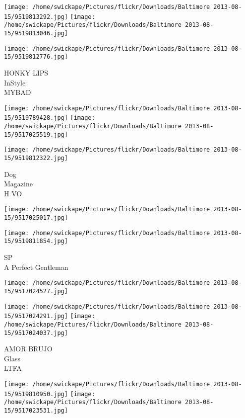 \documentclass[10pt,letterpaper]{article}
\begin{document}
\texttt{[image: /home/swickape/Pictures/flickr/Downloads/Baltimore 2013-08-15/9519813292.jpg]}
\texttt{[image: /home/swickape/Pictures/flickr/Downloads/Baltimore 2013-08-15/9519813046.jpg]}

\vspace{0.25in}
\texttt{[image: /home/swickape/Pictures/flickr/Downloads/Baltimore 2013-08-15/9519812776.jpg]}

HONKY LIPS\\
InStyle\\
MYBAD\\
\pagebreak

\texttt{[image: /home/swickape/Pictures/flickr/Downloads/Baltimore 2013-08-15/9519789428.jpg]}
\texttt{[image: /home/swickape/Pictures/flickr/Downloads/Baltimore 2013-08-15/9517025519.jpg]}

\texttt{[image: /home/swickape/Pictures/flickr/Downloads/Baltimore 2013-08-15/9519812322.jpg]}

Dog\\
Magazine\\
H VO\\
\pagebreak

\texttt{[image: /home/swickape/Pictures/flickr/Downloads/Baltimore 2013-08-15/9517025017.jpg]}

\vspace{0.25in}
\texttt{[image: /home/swickape/Pictures/flickr/Downloads/Baltimore 2013-08-15/9519811854.jpg]}

SP\\
A Perfect Gentleman\\
\pagebreak

\texttt{[image: /home/swickape/Pictures/flickr/Downloads/Baltimore 2013-08-15/9517024527.jpg]}

\vspace{0.25in}
\texttt{[image: /home/swickape/Pictures/flickr/Downloads/Baltimore 2013-08-15/9517024291.jpg]}
\texttt{[image: /home/swickape/Pictures/flickr/Downloads/Baltimore 2013-08-15/9517024037.jpg]}

AMOR BRUJO\\
Glass\\
LTFA\\
\pagebreak

\texttt{[image: /home/swickape/Pictures/flickr/Downloads/Baltimore 2013-08-15/9519810950.jpg]}
\texttt{[image: /home/swickape/Pictures/flickr/Downloads/Baltimore 2013-08-15/9517023531.jpg]}
\end{document}
